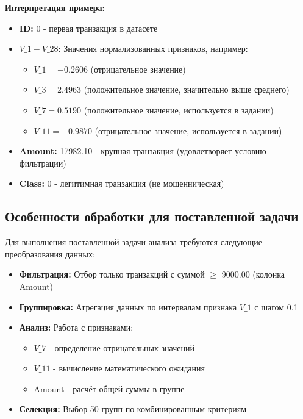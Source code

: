 \documentclass[areaset=advanced]{scrartcl}
\begin{document}
\noindent\textbf{Интерпретация примера:}
\begin{itemize}
    \item \textbf{ID:} 0 - первая транзакция в датасете
    \item $V\_1-V\_{28}$: Значения нормализованных признаков, например:
    \begin{itemize}
        \item $V\_1 = -0.2606$ (отрицательное значение)
        \item $V\_3 = 2.4963$ (положительное значение, значительно выше среднего)
        \item $V\_7 = 0.5190$ (положительное значение, используется в задании)
        \item $V\_{11} = -0.9870$ (отрицательное значение, используется в задании)
    \end{itemize}
    \item \textbf{Amount:} 17982.10 - крупная транзакция (удовлетворяет условию фильтрации)
    \item \textbf{Class:} 0 - легитимная транзакция (не мошенническая)
\end{itemize}

\subsection{Особенности обработки для поставленной задачи}

Для выполнения поставленной задачи анализа требуются следующие преобразования данных:

\begin{itemize}
    \item \textbf{Фильтрация:} Отбор только транзакций с суммой $\geq$ 9000.00 (колонка Amount)
    \item \textbf{Группировка:} Агрегация данных по интервалам признака $V\_1$ с шагом 0.1
    \item \textbf{Анализ:} Работа с признаками:
    \begin{itemize}
        \item $V\_7$ - определение отрицательных значений
        \item $V\_{11}$ - вычисление математического ожидания
        \item Amount - расчёт общей суммы в группе
    \end{itemize}
    \item \textbf{Селекция:} Выбор 50 групп по комбинированным критериям
\end{itemize}
\end{document}
